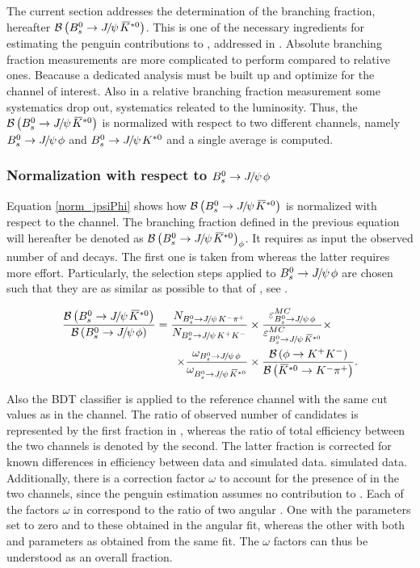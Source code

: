 
The current section addresses the determination of the \BsJpsiKst branching fraction, hereafter $\BRof\BsJpsiKst$.
This is one of the necessary ingredients for estimating the penguin contributions to \phis, addressed in .
Absolute branching fraction measurements are more complicated to perform compared to relative ones. Beacause a
dedicated analysis must be built up and optimize for the channel of interest. Also in a relative branching fraction
measurement some systematics drop out, \ie systematics releated to the luminosity. Thus, the $\BRof\BsJpsiKst$ is
normalized with respect to two different channels, namely $\BsJpsiPhi$ and $\BdJpsiKst$ and a single average is computed.

\subsubsection{Normalization with respect to $\BsJpsiPhi$}
Equation \ref{norm_jpsiPhi} shows how $\BRof\BsJpsiKst$ is normalized with respect to the \BsJpsiPhi channel.
The branching fraction defined in the previous equation will hereafter be denoted as $\BRof{\BsJpsiKst}_\phi$.
It requires as input the observed number of \BsJpsiKst and \BsJpsiPhi decays. The first one is taken from
 whereas the latter requires more effort. Particularly, the selection steps applied
to $\BsJpsiPhi$ are chosen such that they are as similar as possible to that of \BsJpsiKst, see .

\begin{align}
  \centering
\frac{\BRof\BsJpsiKst}{\BRof\BsJpsiPhi} = \frac{N_{\BsJpsiKpi}}{N_{\BsJpsiKK}}
                                  &\times \frac{\varepsilon_{\BsJpsiPhi}^{MC}}{\varepsilon_{\BsJpsiKst}^{MC}}
                                   \times \nonumber \\
                                  \times \frac{\omega_{\BsJpsiPhi}}{\omega_{\BsJpsiKst}}
                                  & \times \frac{\BRof{\phi\to\kaon^+\kaon^-}}{\BRof{\Kstarzb\to\kaon^-\pion^+}}.
\label{norm_jpsiPhi}
\end{align}

\noindent Also the BDT classifier is applied to the reference channel
with the same cut values as in the \BsJpsiKst channel. The ratio of observed number of candidates is represented by the
first fraction in , whereas the ratio of total efficiency between the two channels is denoted
by the second. The latter fraction is corrected for known differences in efficiency between data and simulated data.
simulated data. Additionally, there is a correction factor $\omega$ to account for the presence of \swave in the two
channels, since the penguin estimation assumes no \swave contribution to \BsJpsiKst. Each of the factors $\omega$ in
 correspond to the ratio of two angular \pdfs. One with the \swave parameters set to zero and
\pwave to these obtained in the angular fit,  whereas the other with both \pwave and \swave parameters as obtained
from the same fit. The $\omega$ factors can thus be understood as an overall \swave fraction.

